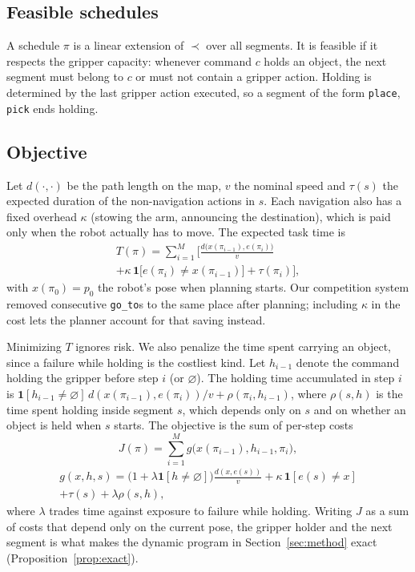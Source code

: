 \documentclass[conference]{IEEEtran}
\newcommand{\todo}[1]{}
\newcommand{\todo}[1]{\textcolor{red}{[TODO: #1]}}
\newcommand{\code}[1]{\texttt{#1}}
\newcommand{\pre}{\prec}
\newcommand{\one}{\mathbf{1}}
\begin{document}
\subsection{Feasible schedules}
A schedule $\pi$ is a linear extension of $\pre$ over all segments. It is
feasible if it respects the gripper capacity: whenever command $c$ holds an
object, the next segment must belong to $c$ or must not contain a gripper
action. Holding is determined by the last gripper action executed, so a segment
of the form \code{place}, \code{pick} ends holding.

\subsection{Objective}
Let $d(\cdot,\cdot)$ be the path length on the map, $v$ the nominal speed and
$\tau(s)$ the expected duration of the non-navigation actions in $s$. Each
navigation also has a fixed overhead $\kappa$ (stowing the arm, announcing the
destination), which is paid only when the robot actually has to move. The
expected task time is
\begin{multline}
T(\pi)=\sum_{i=1}^{M}\Big[\frac{d\big(x(\pi_{i-1}),e(\pi_i)\big)}{v}\\
+\kappa\,\one\big[e(\pi_i)\neq x(\pi_{i-1})\big]+\tau(\pi_i)\Big],
\end{multline}
with $x(\pi_0)=p_0$ the robot's pose when planning starts. Our competition
system removed consecutive \code{go\_to}s to the same place after planning;
including $\kappa$ in the cost lets the planner account for that saving
instead.

Minimizing $T$ ignores risk. We also penalize the time spent carrying an
object, since a failure while holding is the costliest kind. Let $h_{i-1}$
denote the command holding the gripper before step $i$ (or $\varnothing$). The
holding time accumulated in step $i$ is
$\one[h_{i-1}\neq\varnothing]\,d(x(\pi_{i-1}),e(\pi_i))/v+\rho(\pi_i,h_{i-1})$,
where $\rho(s,h)$ is the time spent holding inside segment $s$, which depends
only on $s$ and on whether an object is held when $s$ starts. The objective is
the sum of per-step costs
\begin{equation}\label{eq:stage}
J(\pi)=\sum_{i=1}^{M} g\big(x(\pi_{i-1}),h_{i-1},\pi_i\big),
\end{equation}
\begin{multline*}
g(x,h,s)=\Big(1+\lambda\one[h\neq\varnothing]\Big)\frac{d(x,e(s))}{v}
+\kappa\,\one[e(s)\neq x]\\+\tau(s)+\lambda\rho(s,h),
\end{multline*}
where $\lambda$ trades time against exposure to failure while holding. Writing
$J$ as a sum of costs that depend only on the current pose, the gripper holder
and the next segment is what makes the dynamic program in
Section~\ref{sec:method} exact (Proposition~\ref{prop:exact}).
\todo{Derive $\lambda$ from the score sheet if possible, or select it on a
held-out set of batches.}
\end{document}
